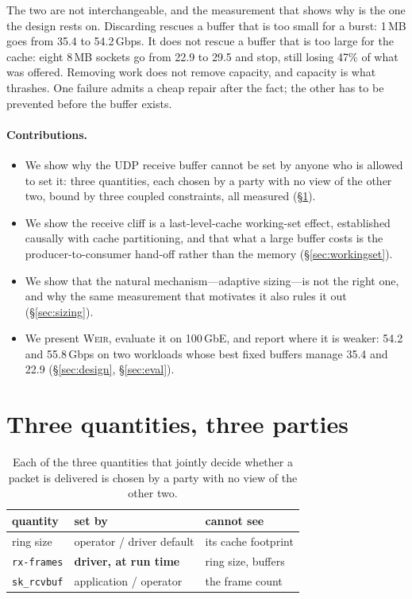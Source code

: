 \documentclass[letterpaper,twocolumn,10pt]{article}
\newcommand{\sys}{\textsc{Weir}\xspace}
\newcommand{\rcvbuf}{\texttt{sk\_rcvbuf}\xspace}
\newcommand{\rxframes}{\texttt{rx-frames}\xspace}
\begin{document}
The two are not interchangeable, and the measurement that shows why is the one
the design rests on. Discarding rescues a buffer that is too small for a burst:
1\,MB goes from 35.4 to 54.2\,Gbps. It does not rescue a buffer that is too
large for the cache: eight 8\,MB sockets go from 22.9 to 29.5 and stop, still
losing 47\% of what was offered. Removing work does not remove capacity, and
capacity is what thrashes. One failure admits a cheap repair after the fact; the
other has to be prevented before the buffer exists.

\paragraph{Contributions.}
\begin{itemize}
\itemsep0em
\item We show why the UDP receive buffer cannot be set by anyone who is allowed
to set it: three quantities, each chosen by a party with no view of the other
two, bound by three coupled constraints, all measured (\S\ref{sec:three}).
\item We show the receive cliff is a last-level-cache working-set effect,
established causally with cache partitioning, and that what a large buffer costs
is the producer-to-consumer hand-off rather than the memory
(\S\ref{sec:workingset}).
\item We show that the natural mechanism---adaptive sizing---is not the right
one, and why the same measurement that motivates it also rules it out
(\S\ref{sec:sizing}).
\item We present \sys, evaluate it on 100\,GbE, and report where it is weaker:
54.2 and 55.8\,Gbps on two workloads whose best fixed buffers manage 35.4 and
22.9 (\S\ref{sec:design}, \S\ref{sec:eval}).
\end{itemize}



\section{Three quantities, three parties}
\label{sec:three}

\begin{table}[t]
\centering
\small
\begin{tabular}{@{}lll@{}}
\toprule
quantity & set by & cannot see \\
\midrule
ring size & operator / driver default & its cache footprint \\
\rxframes & \textbf{driver, at run time} & ring size, buffers \\
\rcvbuf & application / operator & the frame count \\
\bottomrule
\end{tabular}
\caption{Each of the three quantities that jointly decide whether a packet is
delivered is chosen by a party with no view of the other two.}
\label{tab:three}
\end{table}
\end{document}
